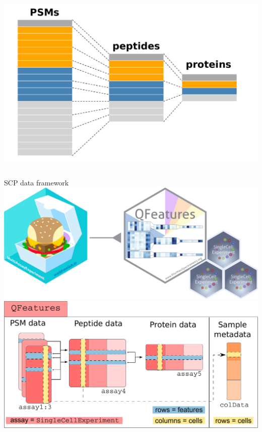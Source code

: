 \documentclass{beamer}
\begin{document}
\begin{frame}[allowframebreaks]
\begin{columns}
    \includegraphics[width=\linewidth]{figs/QFeatures.pdf}
  \end{columns}
  
  \framebreak

  \centering
  \vfill 
  SCP data framework
  \vfill
  \includegraphics[width=0.4\linewidth]{figs/sticker_scp.png}
  \vfill
  \includegraphics[width=0.9\linewidth]{figs/SCP_framework.pdf}
  
\end{frame}
\end{document}
